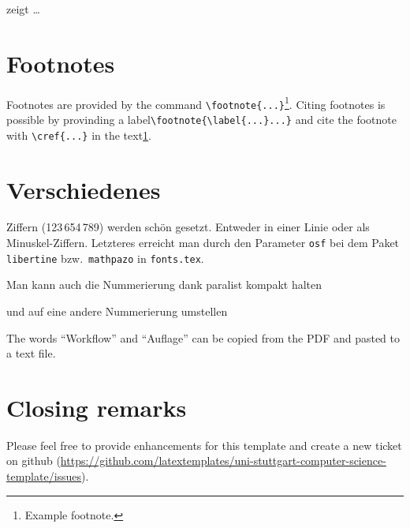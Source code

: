  zeigt \ldots

\section{Footnotes}
Footnotes are provided by the command \verb+\footnote{...}+\footnote{\label{fussnote}Example footnote.}. Citing footnotes is possible by provinding a label\verb+\footnote{\label{...}...}+ and cite the footnote with \verb+\cref{...}+ in the text\cref{fussnote}.

\section{Verschiedenes}
\label{sec:diff}
\ifdeutsch
  Ziffern (123\,654\,789) werden schön gesetzt.
  Entweder in einer Linie oder als Minuskel-Ziffern.
  Letzteres erreicht man durch den Parameter \texttt{osf} bei dem Paket \texttt{libertine} bzw.\ \texttt{mathpazo} in \texttt{fonts.tex}.
\fi

\begin{compactenum}[I.]
  \item Man kann auch die Nummerierung dank paralist kompakt halten
  \item und auf eine andere Nummerierung umstellen
\end{compactenum}

The words \enquote{Workflow} and \enquote{Auflage} can be copied from the PDF and pasted to a text file.


\section{Closing remarks}
Please feel free to provide enhancements for this template and create a new ticket on github (\url{https://github.com/latextemplates/uni-stuttgart-computer-science-template/issues}).
